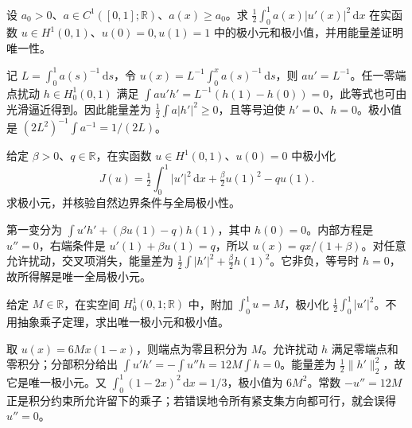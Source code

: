 \begin{exercise}\label{b2:ex:14-weighted-string}
设 \(a_0>0\)、\(a\in C^1([0,1];\mathbb R)\)、\(a(x)\geq a_0\)。求 \(\tfrac12\int_0^1a(x)|u'(x)|^2\,\mathrm dx\) 在实函数 \(u\in H^1(0,1)\)、\(u(0)=0,u(1)=1\) 中的极小元和极小值，并用能量差证明唯一性。
\end{exercise}
\begin{solution}
记 \(L=\int_0^1a(s)^{-1}\,\mathrm ds\)，令 \(u(x)=L^{-1}\int_0^x a(s)^{-1}\,\mathrm ds\)，则 \(au'=L^{-1}\)。任一零端点扰动 \(h\in H_0^1(0,1)\) 满足 \(\int au'h'=L^{-1}(h(1)-h(0))=0\)，此等式也可由光滑逼近得到。因此能量差为 \(\tfrac12\int a|h'|^2\ge0\)，且等号迫使 \(h'=0\)、\(h=0\)。极小值是 \((2L^2)^{-1}\int a^{-1}=1/(2L)\)。
\end{solution}

\begin{exercise}\label{b2:ex:14-boundary-spring}
给定 \(\beta>0\)、\(q\in\mathbb R\)，在实函数 \(u\in H^1(0,1)\)、\(u(0)=0\) 中极小化
\[J(u)=\tfrac12\int_0^1|u'|^2\,\mathrm dx+\tfrac\beta2u(1)^2-qu(1).\]
求极小元，并核验自然边界条件与全局极小性。
\end{exercise}
\begin{solution}
第一变分为 \(\int u'h'+(\beta u(1)-q)h(1)\)，其中 \(h(0)=0\)。内部方程是 \(u''=0\)，右端条件是 \(u'(1)+\beta u(1)=q\)，所以 \(u(x)=qx/(1+\beta)\)。对任意允许扰动，交叉项消失，能量差为 \(\tfrac12\int|h'|^2+\tfrac\beta2h(1)^2\)。它非负，等号时 \(h=0\)，故所得解是唯一全局极小元。
\end{solution}

\begin{exercise}\label{b2:ex:14-mass-constraint}
给定 \(M\in\mathbb R\)，在实空间 \(H_0^1(0,1;\mathbb R)\) 中，附加 \(\int_0^1u=M\)，极小化 \(\tfrac12\int_0^1|u'|^2\)。不用抽象乘子定理，求出唯一极小元和极小值。
\end{exercise}
\begin{solution}
取 \(u(x)=6Mx(1-x)\)，则端点为零且积分为 \(M\)。允许扰动 \(h\) 满足零端点和零积分；分部积分给出 \(\int u'h'=-\int u''h=12M\int h=0\)。能量差为 \(\tfrac12\lVert h'\rVert_2^2\)，故它是唯一极小元。又 \(\int_0^1(1-2x)^2\,\mathrm dx=1/3\)，极小值为 \(6M^2\)。常数 \(-u''=12M\) 正是积分约束所允许留下的乘子；若错误地令所有紧支集方向都可行，就会误得 \(u''=0\)。
\end{solution}

